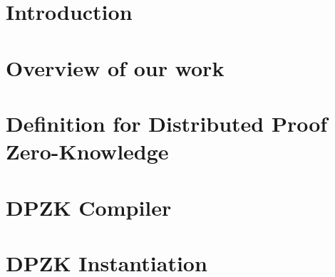 \documentclass[USenglish,oneside,twocolumn]{article}
\begin{document}
\section{Introduction}
\label{sec:intro}

\section{Overview of our work}
\label{sec:overview}

%
\section{Definition for Distributed Proof Zero-Knowledge}
\label{sec:security model}

\section{DPZK Compiler}
\label{sec:compiler}

\section{DPZK Instantiation}
\label{sec:instantiations}

%
%
%
\end{document}
